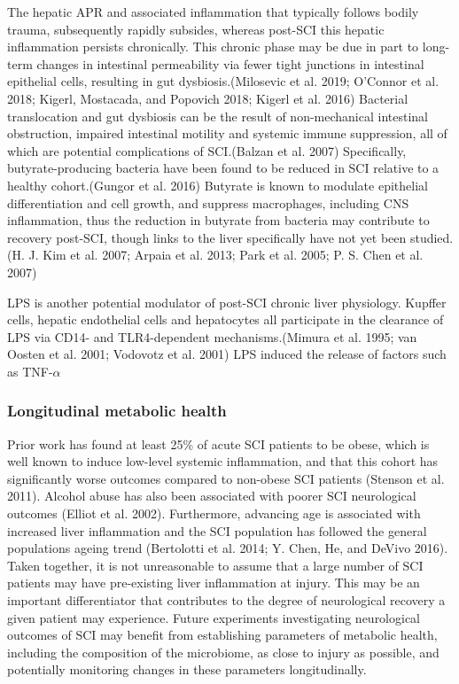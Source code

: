 \documentclass[9pt,lineno]{elife}
\begin{document}
\begin{landscape}
\begin{landscape}
The hepatic APR and associated inflammation that typically follows bodily trauma, subsequently rapidly subsides, whereas post-SCI this hepatic inflammation persists chronically.
This chronic phase may be due in part to long-term changes in intestinal permeability via fewer tight junctions in intestinal epithelial cells, resulting in gut dysbiosis.(Milosevic et al. 2019; O'Connor et al. 2018; Kigerl, Mostacada, and Popovich 2018; Kigerl et al. 2016) Bacterial translocation and gut dysbiosis can be the result of non-mechanical intestinal obstruction, impaired intestinal motility and systemic immune suppression, all of which are potential complications of SCI.(Balzan et al. 2007) Specifically, butyrate-producing bacteria have been found to be reduced in SCI relative to a healthy cohort.(Gungor et al. 2016) Butyrate is known to modulate epithelial differentiation and cell growth, and suppress macrophages, including CNS inflammation, thus the reduction in butyrate from bacteria may contribute to recovery post-SCI, though links to the liver specifically have not yet been studied.(H. J. Kim et al. 2007; Arpaia et al. 2013; Park et al. 2005; P. S. Chen et al. 2007)

LPS is another potential modulator of post-SCI chronic liver physiology.
Kupffer cells, hepatic endothelial cells and hepatocytes all participate in the clearance of LPS via CD14- and TLR4-dependent mechanisms.(Mimura et al. 1995; van Oosten et al. 2001; Vodovotz et al. 2001) LPS induced the release of factors such as TNF-\(\alpha\)

\hypertarget{longitudinal-metabolic-health}{%
\subsubsection{Longitudinal metabolic health}\label{longitudinal-metabolic-health}}

Prior work has found at least 25\% of acute SCI patients to be obese, which is well known to induce low-level systemic inflammation, and that this cohort has significantly worse outcomes compared to non-obese SCI patients (Stenson et al. 2011). Alcohol abuse has also been associated with poorer SCI neurological outcomes (Elliot et al. 2002). Furthermore, advancing age is associated with increased liver inflammation and the SCI population has followed the general populations ageing trend (Bertolotti et al. 2014; Y. Chen, He, and DeVivo 2016).
Taken together, it is not unreasonable to assume that a large number of SCI patients may have pre-existing liver inflammation at injury.
This may be an important differentiator that contributes to the degree of neurological recovery a given patient may experience.
Future experiments investigating neurological outcomes of SCI may benefit from establishing parameters of metabolic health, including the composition of the microbiome, as close to injury as possible, and potentially monitoring changes in these parameters longitudinally.


\end{landscape}
\end{landscape}
\end{document}
